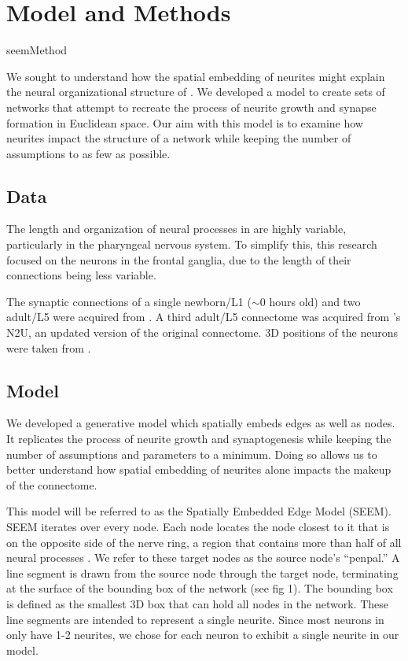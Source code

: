 \section{Model and Methods}

{seemMethod}

We sought to understand how the spatial embedding of neurites might explain the neural organizational structure of \ce. 
We developed a model to create sets of networks that attempt to recreate the process of neurite growth and synapse formation in Euclidean space. 
Our aim with this model is to examine how neurites impact the structure of a network while keeping the number of assumptions to as few as possible.

\subsection{Data}
The length and organization of neural processes in \ce are highly variable, particularly in the pharyngeal nervous system. 
To simplify this, this research focused on the neurons in the frontal ganglia, due to the length of their connections being less variable. 

The synaptic connections of a single newborn/L1 ($\sim 0$ hours old) and two adult/L5 \ce were acquired from \cite{Witvliet}.
A third adult/L5 connectome was acquired from \cite{Durbin}'s N2U, an updated version of the original \cite{White} connectome. 
3D positions of the neurons were taken from \cite{Skuhersky}. 

\subsection{Model}
We developed a generative model which spatially embeds edges as well as nodes. 
It replicates the process of neurite growth and synaptogenesis while keeping the number of assumptions and parameters to a minimum. 
Doing so allows us to better understand how spatial embedding of neurites alone impacts the makeup of the connectome.

This model will be referred to as the Spatially Embedded Edge Model (SEEM). 
SEEM iterates over every node. 
Each node locates the node closest to it that is on the opposite side of the nerve ring, a region that contains more than half of all neural processes \citep{Altun}. 
We refer to these target nodes as the source node's ``penpal.''
A line segment is drawn from the source node through the target node, terminating at the surface of the bounding box of the network (see fig 1). 
The bounding box is defined as the smallest 3D box that can hold all nodes in the network. 
These line segments are intended to represent a single neurite. 
Since most neurons in \ce only have 1-2 neurites, we chose for each neuron to exhibit a single neurite in our model.

